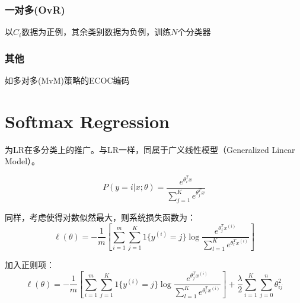 \documentclass[10pt,a4paper]{ctexbook}
\begin{document}
\subsubsection{一对多(OvR)}
以$C_{i}$数据为正例，其余类别数据为负例，训练$N$个分类器

\subsubsection{其他}
如多对多(MvM)策略的ECOC编码


\section{Softmax Regression}
为LR在多分类上的推广。与LR一样，同属于广义线性模型（Generalized Linear Model）。

\[
P(y=i|x;{\theta})={\frac {e^{{\theta}_{i}^{T}x}}{\sum_{j=1}^{K}{e^{{\theta}_{j}^{T}x}}}}
\]

同样，考虑使得对数似然最大，则系统损失函数为：
\[
\ell(\theta)=-{\frac {1}{m}}\left[\sum\limits_{i=1}^{m}{\sum\limits_{j=1}^{K}{1\{y^{(i)}=j\}\log{\frac{e^{{\theta}_{j}^{T}{x^{(i)}}}}{\sum_{l=1}^{K}{e^{\theta_{l}^{T}x^{(i)}}}}}}}\right]
\]

加入正则项：
\[
\ell(\theta)=-{\frac {1}{m}}\left[\sum\limits_{i=1}^{m}{\sum\limits_{j=1}^{K}{1\{y^{(i)}=j\}\log{\frac{e^{{\theta}_{j}^{T}{x^{(i)}}}}{\sum_{l=1}^{K}{e^{\theta_{l}^{T}x^{(i)}}}}}}}\right]+
    {\frac {\lambda}{2}{\sum\limits_{i=1}^{K}{\sum\limits_{j=0}^{n}{\theta_{ij}^{2}}}}}
\]
\end{document}
